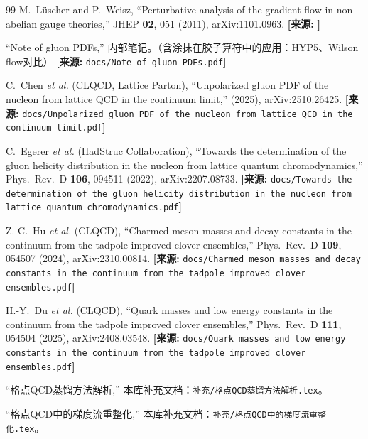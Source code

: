 \documentclass[12pt,a4paper]{ctexart}
\theoremstyle{definition}
\begin{document}
\begin{thebibliography}{99}
M.~L\"uscher and P.~Weisz,
``Perturbative analysis of the gradient flow in non-abelian gauge theories,''
JHEP \textbf{02}, 051 (2011), arXiv:1101.0963.
\quad\textbf{[来源:} \texttt{}\textbf{]}


``Note of gluon PDFs,''
内部笔记。（含涂抹在胶子算符中的应用：HYP5、Wilson flow对比）
\quad\textbf{[来源:} \texttt{docs/Note of gluon PDFs.pdf}\textbf{]}

C.~Chen \textit{et al.} (CLQCD, Lattice Parton),
``Unpolarized gluon PDF of the nucleon from lattice QCD in the continuum limit,''
(2025), arXiv:2510.26425.
\quad\textbf{[来源:} \texttt{docs/Unpolarized gluon PDF of the nucleon from lattice QCD in the continuum limit.pdf}\textbf{]}

C.~Egerer \textit{et al.} (HadStruc Collaboration),
``Towards the determination of the gluon helicity distribution in the nucleon from lattice quantum chromodynamics,''
Phys.\ Rev.\ D \textbf{106}, 094511 (2022), arXiv:2207.08733.
\quad\textbf{[来源:} \texttt{docs/Towards the determination of the gluon helicity distribution in the nucleon from lattice quantum chromodynamics.pdf}\textbf{]}

Z.-C.~Hu \textit{et al.} (CLQCD),
``Charmed meson masses and decay constants in the continuum from the tadpole improved clover ensembles,''
Phys.\ Rev.\ D \textbf{109}, 054507 (2024), arXiv:2310.00814.
\quad\textbf{[来源:} \texttt{docs/Charmed meson masses and decay constants in the continuum from the tadpole improved clover ensembles.pdf}\textbf{]}

H.-Y.~Du \textit{et al.} (CLQCD),
``Quark masses and low energy constants in the continuum from the tadpole improved clover ensembles,''
Phys.\ Rev.\ D \textbf{111}, 054504 (2025), arXiv:2408.03548.
\quad\textbf{[来源:} \texttt{docs/Quark masses and low energy constants in the continuum from the tadpole improved clover ensembles.pdf}\textbf{]}


``格点QCD蒸馏方法解析,''
本库补充文档：\texttt{补充/格点QCD蒸馏方法解析.tex}。

``格点QCD中的梯度流重整化,''
本库补充文档：\texttt{补充/格点QCD中的梯度流重整化.tex}。

\end{thebibliography}
\end{document}
